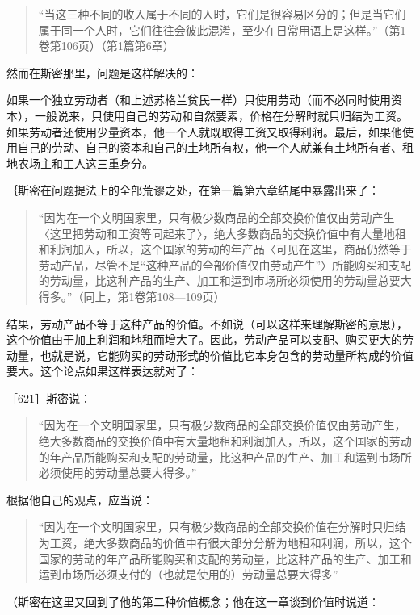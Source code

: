 \begin{quote}{“当这三种不同的收入属于不同的人时，它们是很容易区分的；但是当它们属于同一个人时，它们往往会彼此混淆，至少在日常用语上是这样。”（第1卷第106页）（第1篇第6章）}\end{quote}

然而在斯密那里，问题是这样解决的：

如果一个独立劳动者（和上述苏格兰贫民一样）只使用劳动（而不必同时使用资本），一般说来，只使用自己的劳动和自然要素，价格在分解时就只归结为工资。如果劳动者还使用少量资本，他一个人就既取得工资又取得利润。最后，如果他使用自己的劳动、自己的资本和自己的土地所有权，他一个人就兼有土地所有者、租地农场主和工人这三重身分。

｛斯密在问题提法上的全部荒谬之处，在第一篇第六章结尾中暴露出来了：

\begin{quote}{“因为在一个文明国家里，只有极少数商品的全部交换价值仅由劳动产生〈这里把劳动和工资等同起来了〉，绝大多数商品的交换价值中有大量地租和利润加入，所以，这个国家的劳动的年产品〈可见在这里，商品仍然等于劳动产品，尽管不是“这种产品的全部价值仅由劳动产生”〉所能购买和支配的劳动量，比这种产品的生产、加工和运到市场所必须使用的劳动量总要大得多。”（同上，第1卷第108—109页）}\end{quote}

结果，劳动产品不等于这种产品的价值。不如说（可以这样来理解斯密的意思），这个价值由于加上利润和地租而增大了。因此，劳动产品可以支配、购买更大的劳动量，也就是说，它能购买的劳动形式的价值比它本身包含的劳动量所构成的价值要大。这个论点如果这样表达就对了：

［621］斯密说：

\begin{quote}{“因为在一个文明国家里，只有极少数商品的全部交换价值仅由劳动产生，绝大多数商品的交换价值中有大量地租和利润加入，所以，这个国家的劳动的年产品所能购买和支配的劳动量，比这种产品的生产、加工和运到市场所必须使用的劳动量总要大得多。”}\end{quote}

根据他自己的观点，应当说：

\begin{quote}{“因为在一个文明国家里，只有极少数商品的全部交换价值在分解时只归结为工资，绝大多数商品的价值中有很大部分分解为地租和利润，所以，这个国家的劳动的年产品所能购买和支配的劳动量，比这种产品的生产、加工和运到市场所必须支付的（也就是使用的）劳动量总要大得多”}\end{quote}

（斯密在这里又回到了他的第二种价值概念；他在这一章谈到价值时说道：

